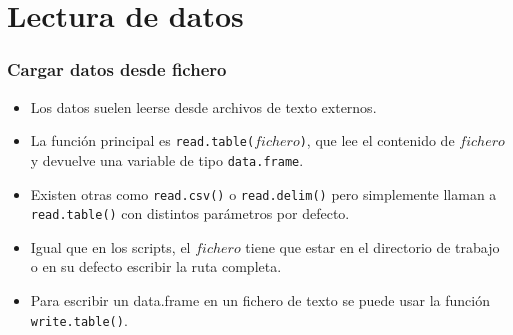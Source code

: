 \documentclass{beamer}
\begin{document}
\section{Lectura de datos}

\begin{frame}[fragile]
\frametitle{Cargar datos desde fichero}

\begin{itemize}
\item Los datos suelen leerse desde archivos de texto externos.
\item La función principal es \texttt{read.table($fichero$)}, que lee el contenido de $fichero$ y devuelve una variable de tipo \texttt{data.frame}.
\item Existen otras como \texttt{read.csv()} o \texttt{read.delim()} pero simplemente llaman a \texttt{read.table()} con distintos parámetros por defecto.
\item Igual que en los scripts, el $fichero$ tiene que estar en el directorio de trabajo o en su defecto escribir la ruta completa.
\item Para escribir un data.frame en un fichero de texto se puede usar la función \texttt{write.table()}.
\end{itemize}

\end{frame}
\end{document}
